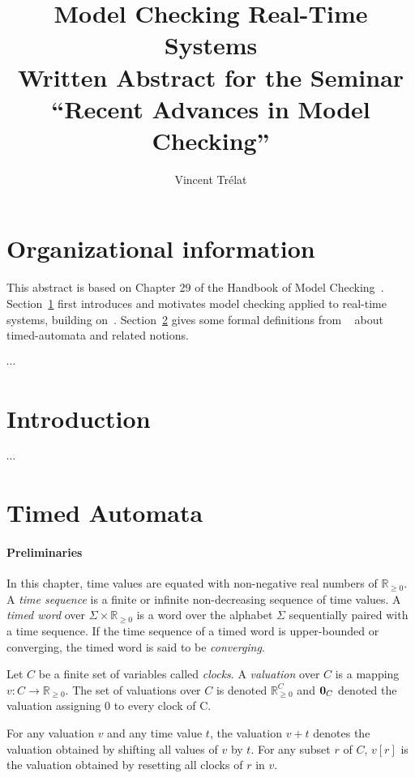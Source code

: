 \documentclass[11pt]{article}
\title{Model Checking Real-Time Systems\\\small Written Abstract for the Seminar ``Recent Advances in Model Checking''}
\author{Vincent Trélat}
\date{}
\theoremstyle{definition}
\theoremstyle{remark}
\begin{document}
\maketitle	

\section*{Organizational information}
This abstract is based on Chapter 29 of the Handbook of Model Checking~\cite{handbook}.
Section~\ref{sec:intro} first introduces and motivates model checking applied to real-time systems, building on~\cite[Chapter~29.1]{handbook}.
Section~\ref{sec:ta} gives some formal definitions from ~\cite[Chapter 29.2]{handbook} about timed-automata and related notions.

$\cdots$

\section{Introduction}\label{sec:intro}
$\cdots$

\section{Timed Automata}\label{sec:ta}
\paragraph{Preliminaries}\label{par:prelims}
In this chapter, time values are equated with non-negative real numbers of $\mathbb{R}_{\geq 0}$. A \emph{time sequence} is a finite or infinite non-decreasing sequence of time values. A \emph{timed word} over $\Sigma \times \mathbb{R}_{\geq 0}$ is a word over the alphabet $\Sigma$ sequentially paired with a time sequence. If the time sequence of a timed word is upper-bounded or converging, the timed word is said to be \emph{converging}.

Let $C$ be a finite set of variables called \emph{clocks}. A \emph{valuation} over $C$ is a mapping $v \colon C \to \mathbb{R}_{\geq 0}$. The set of valuations over $C$ is denoted $\mathbb{R}_{\geq 0}^C$ and $\text{\bf 0}_C$ denoted the valuation assigning 0 to every clock of C.

For any valuation $v$ and any time value $t$, the valuation $v + t$ denotes the valuation obtained by shifting all values of $v$ by $t$. For any subset $r$ of $C$, $v[r]$ is the valuation obtained by resetting all clocks of $r$ in $v$.
\end{document}
